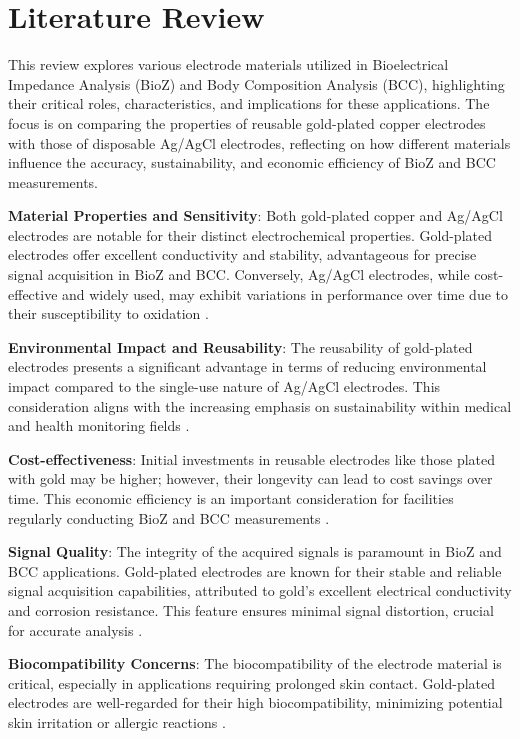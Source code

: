 \section{Literature Review}

{
This review explores various electrode materials utilized in Bioelectrical Impedance Analysis (BioZ) and Body Composition Analysis (BCC), highlighting their critical roles, characteristics, and implications for these applications. The focus is on comparing the properties of reusable gold-plated copper electrodes with those of disposable Ag/AgCl electrodes, reflecting on how different materials influence the accuracy, sustainability, and economic efficiency of BioZ and BCC measurements.

 \textbf{Material Properties and Sensitivity}: Both gold-plated copper and Ag/AgCl electrodes are notable for their distinct electrochemical properties. Gold-plated electrodes offer excellent conductivity and stability, advantageous for precise signal acquisition in BioZ and BCC. Conversely, Ag/AgCl electrodes, while cost-effective and widely used, may exhibit variations in performance over time due to their susceptibility to oxidation \cite{Zen2004Amino}.

 \textbf{Environmental Impact and Reusability}: The reusability of gold-plated electrodes presents a significant advantage in terms of reducing environmental impact compared to the single-use nature of Ag/AgCl electrodes. This consideration aligns with the increasing emphasis on sustainability within medical and health monitoring fields \cite{NunezBajo2017Integration}.

 \textbf{Cost-effectiveness}: Initial investments in reusable electrodes like those plated with gold may be higher; however, their longevity can lead to cost savings over time. This economic efficiency is an important consideration for facilities regularly conducting BioZ and BCC measurements \cite{Tallgren2005Evaluation}.

 \textbf{Signal Quality}: The integrity of the acquired signals is paramount in BioZ and BCC applications. Gold-plated electrodes are known for their stable and reliable signal acquisition capabilities, attributed to gold's excellent electrical conductivity and corrosion resistance. This feature ensures minimal signal distortion, crucial for accurate analysis \cite{Zhao2018Fabrication}.

 \textbf{Biocompatibility Concerns}: The biocompatibility of the electrode material is critical, especially in applications requiring prolonged skin contact. Gold-plated electrodes are well-regarded for their high biocompatibility, minimizing potential skin irritation or allergic reactions \cite{Almeida2014On-site}.
    
}
